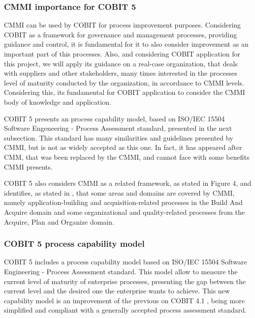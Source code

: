 \subsubsection{CMMI importance for COBIT 5}

CMMI can be used by COBIT for process improvement purposes. Considering COBIT as a framework for governance and management processes, providing guidance and control, it is fundamental for it to also consider improvement as an important part of this processes. Also, and considering COBIT application for this project, we will apply its guidance on a real-case organization, that deals with suppliers and other stakeholders, many times interested in the processes level of maturity conducted by the organization, in accordance to CMMI levels. Considering this, its fundamental for COBIT application to consider the CMMI body of knowledge and application.\par
COBIT 5 presents an process capability model, based on ISO/IEC 15504 Software Engeneering - Process Assessment standard, presented in the next subsection. This standard has many similarities and guidelines presented by CMMI, but is not as widely accepted as this one. In fact, it has appeared after CMM, that was been replaced by the CMMI, and cannot face with some benefits CMMI presents.\par
COBIT 5 also considers CMMI as a related framework, as stated in Figure 4, and identifies, as stated in \cite{2012cobit}, that some areas and domains are covered by CMMI, namely application-building and acquisition-related processes in the Build And Acquire domain and some organizational and quality-related processes from the Acquire, Plan and Organize domain.\par


\subsubsection{COBIT 5 process capability model}

COBIT 5 includes a process capability model based on ISO/IEC 15504 Software Engineering - Process Assessment standard.\cite{ISO15504} This model allow to measure the current level of maturity of enterprise processes, presenting the gap between the current level and the desired one the enterprise wants to achieve. This new capability model is an improvement of the previous on COBIT 4.1 \cite{cobit4}, being more simplified and compliant with a generally accepted process assessment standard.\par


